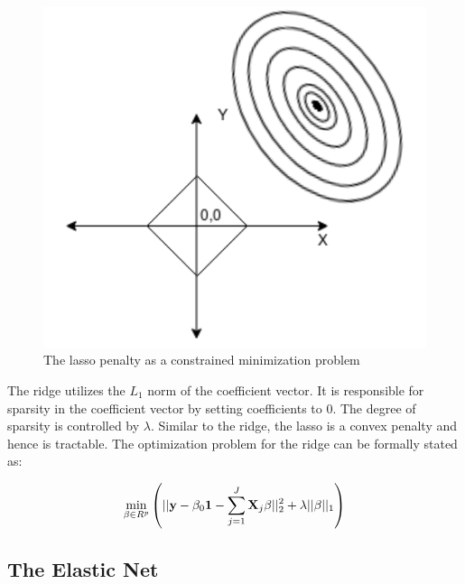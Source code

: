 \documentclass[a4paper,12pt]{article}
\def\bX {{\bf X}}
\def\by{{\bf y}}
\def\bone{{\bf 1}}
\begin{document}
\begin{figure}[H]
    \centering
    \includegraphics[scale=0.4]{lasso.png}
    \caption{The lasso penalty as a constrained minimization problem}
    \label{fig:ALAMO Flowchart}
\end{figure}
The ridge utilizes the $L_1$ norm of the coefficient vector. It is responsible for sparsity in the coefficient vector by setting coefficients to 0. The degree of sparsity is controlled by $\lambda$. Similar to the ridge, the lasso is a convex penalty and hence is tractable. The optimization problem for the ridge can be formally stated as:

\begin{eqnarray}
\label{eq:6}
\min_{\beta\in R^p}\left(||\by-\beta_0\bone-\sum_{j=1}^J
\bX_j\beta||_2^2 + \lambda ||\beta||_1 \right)
\end{eqnarray}


\newpage
\subsection{The Elastic Net}
\end{document}

